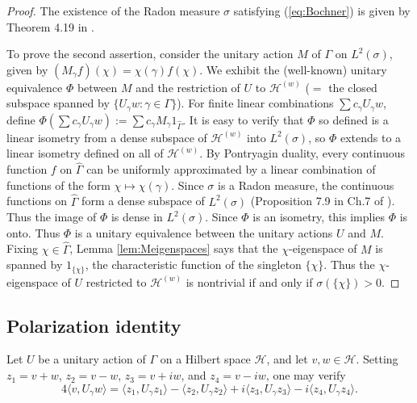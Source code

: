 \documentclass[12pt]{amsart} \usepackage{amsmath,centernot,amssymb,leftindex}
\numberwithin{theorem}{section}
\numberwithin{equation}{section}
\theoremstyle{definition}
\begin{document}
\begin{proof}
	The existence of the Radon measure $\sigma$ satisfying (\ref{eq:Bochner}) is given by Theorem 4.19 in \cite[p.~103]{Folland_CourseInAHA}. 
	
	To prove the second assertion, consider the unitary action $M$ of $\Gamma$ on $L^{2}(\sigma)$, given by $(M_{\gamma}f)(\chi)=\chi(\gamma)f(\chi)$. We exhibit the (well-known) unitary equivalence $\Phi$ between $M$ and the restriction of $U$ to $\mathcal H^{(w)}$ ($=$ the closed subspace spanned by $\{U_{\gamma}w:\gamma \in \Gamma\}$).  For finite linear combinations $\sum c_{\gamma}U_{\gamma}w$, define $\Phi(\sum c_{\gamma}U_{\gamma}w):=\sum c_{\gamma}M_{\gamma}1_{\widehat{\Gamma}}$.  It is easy to verify that $\Phi$ so defined is a linear isometry from a dense subspace of $\mathcal H^{(w)}$ into $L^{2}(\sigma)$, so $\Phi$ extends to a linear isometry defined on all of $\mathcal H^{(w)}$. By Pontryagin duality, every continuous function $f$ on $\widehat{\Gamma}$ can be uniformly approximated by a linear combination of functions of the form $\chi\mapsto \chi(\gamma)$.  Since $\sigma$ is a Radon measure, the continuous functions on $\widehat{\Gamma}$ form a dense subspace of $L^{2}(\sigma)$ (Proposition 7.9 in Ch.7 of \cite{Folland_RealAnalysis}).  Thus the image of $\Phi$ is dense in $L^{2}(\sigma)$.  Since $\Phi$ is an isometry, this implies $\Phi$ is onto.  	Thus $\Phi$ is a unitary equivalence between the unitary actions $U$ and $M$.  Fixing $\chi\in \widehat{\Gamma}$, Lemma \ref{lem:Meigenspaces} says that the $\chi$-eigenspace of $M$ is spanned by $1_{\{\chi\}}$, the characteristic function of the singleton $\{\chi\}$.  Thus the $\chi$-eigenspace of $U$ restricted to $\mathcal H^{(w)}$ is nontrivial if and only if $\sigma(\{\chi\})>0$.
\end{proof}




\subsection{Polarization identity}

Let $U$ be a unitary action of $\Gamma$ on a Hilbert space $\mathcal H$, and let $v,w \in \mathcal H$. Setting $z_1= v+w$, $z_2=v-w$, $z_3=v+iw$, and $z_4=v-iw$, one may verify
\begin{equation}\label{eq:polarization}
	4\langle v,  U_\gamma w\rangle = \langle  z_1, U_\gamma z_1\rangle - \langle z_2,U_\gamma  z_2\rangle + i\langle  z_3,U_\gamma  z_3\rangle - i\langle  z_4,U_\gamma z_4\rangle.
\end{equation}
\end{document}
